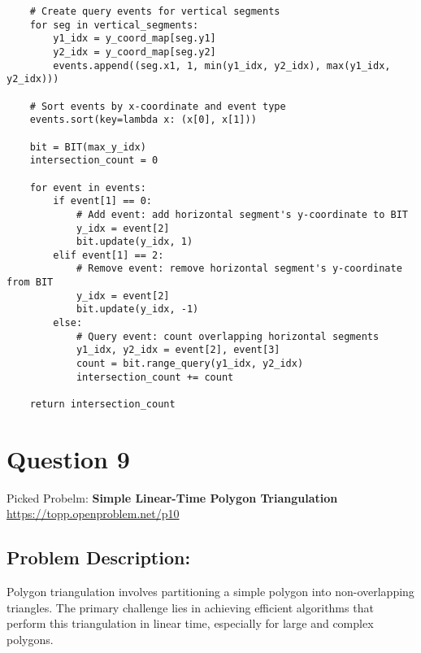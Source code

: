 \documentclass{article}
\begin{document}
\begin{verbatim}
    # Create query events for vertical segments
    for seg in vertical_segments:
        y1_idx = y_coord_map[seg.y1]
        y2_idx = y_coord_map[seg.y2]
        events.append((seg.x1, 1, min(y1_idx, y2_idx), max(y1_idx, y2_idx)))

    # Sort events by x-coordinate and event type
    events.sort(key=lambda x: (x[0], x[1]))

    bit = BIT(max_y_idx)
    intersection_count = 0

    for event in events:
        if event[1] == 0:
            # Add event: add horizontal segment's y-coordinate to BIT
            y_idx = event[2]
            bit.update(y_idx, 1)
        elif event[1] == 2:
            # Remove event: remove horizontal segment's y-coordinate from BIT
            y_idx = event[2]
            bit.update(y_idx, -1)
        else:
            # Query event: count overlapping horizontal segments
            y1_idx, y2_idx = event[2], event[3]
            count = bit.range_query(y1_idx, y2_idx)
            intersection_count += count

    return intersection_count
\end{verbatim}

\newpage

\section*{Question 9}
Picked Probelm: \textbf{Simple Linear-Time Polygon Triangulation} 
\\
\url{https://topp.openproblem.net/p10}

\subsection*{Problem Description:}
Polygon triangulation involves partitioning a simple polygon into non-overlapping triangles.
The primary challenge lies in achieving efficient algorithms that perform this triangulation in linear time, especially for large and complex polygons.
\end{document}
